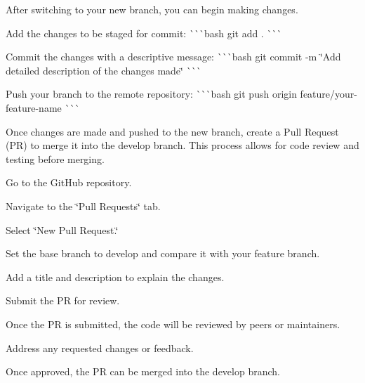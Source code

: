{\ttfamily }

{\ttfamily  After switching to your new branch, you can begin making changes.}

{\ttfamily }

{\ttfamily 
\begin{DoxyEnumerate}
\item Add the changes to be staged for commit\+: \`{}\`{}\`{}bash git add . \`{}\`{}\`{}
\item Commit the changes with a descriptive message\+: \`{}\`{}\`{}bash git commit -\/m \char`\"{}\+Add detailed description of the changes made\char`\"{} \`{}\`{}\`{}
\item Push your branch to the remote repository\+: \`{}\`{}\`{}bash git push origin feature/your-\/feature-\/name \`{}\`{}\`{}
\end{DoxyEnumerate}}

{\ttfamily }

{\ttfamily  Once changes are made and pushed to the new branch, create a Pull Request (PR) to merge it into the {\ttfamily develop} branch. This process allows for code review and testing before merging.}

{\ttfamily 
\begin{DoxyEnumerate}
\item Go to the Git\+Hub repository.
\item Navigate to the \char`\"{}\+Pull Requests\char`\"{} tab.
\item Select \char`\"{}\+New Pull Request.\char`\"{}
\item Set the base branch to {\ttfamily develop} and compare it with your feature branch.
\item Add a title and description to explain the changes.
\item Submit the PR for review.
\end{DoxyEnumerate}}

{\ttfamily }

{\ttfamily 
\begin{DoxyItemize}
\item Once the PR is submitted, the code will be reviewed by peers or maintainers.
\item Address any requested changes or feedback.
\item Once approved, the PR can be merged into the {\ttfamily develop} branch.
\end{DoxyItemize}}

{\ttfamily }

{\ttfamily  }

